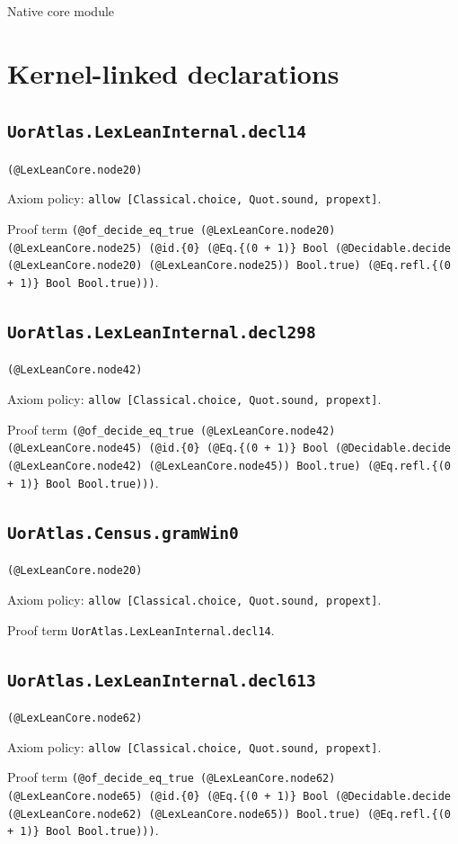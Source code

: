 \documentclass[11pt]{article}
\begin{document}
\begin{center}{\LARGE Native core module}\end{center}
\section*{Kernel-linked declarations}
\subsection*{\texttt{UorAtlas.LexLeanInternal.decl14}}
\noindent\texttt{(@LexLeanCore.node20)}\par
\noindent Axiom policy: \texttt{allow [Classical.choice, Quot.sound, propext]}.\par
\noindent Proof term \texttt{(@of\_decide\_eq\_true (@LexLeanCore.node20) (@LexLeanCore.node25) (@id.\{0\} (@Eq.\{(0 + 1)\} Bool (@Decidable.decide (@LexLeanCore.node20) (@LexLeanCore.node25)) Bool.true) (@Eq.refl.\{(0 + 1)\} Bool Bool.true)))}.\par
\subsection*{\texttt{UorAtlas.LexLeanInternal.decl298}}
\noindent\texttt{(@LexLeanCore.node42)}\par
\noindent Axiom policy: \texttt{allow [Classical.choice, Quot.sound, propext]}.\par
\noindent Proof term \texttt{(@of\_decide\_eq\_true (@LexLeanCore.node42) (@LexLeanCore.node45) (@id.\{0\} (@Eq.\{(0 + 1)\} Bool (@Decidable.decide (@LexLeanCore.node42) (@LexLeanCore.node45)) Bool.true) (@Eq.refl.\{(0 + 1)\} Bool Bool.true)))}.\par
\subsection*{\texttt{UorAtlas.Census.gramWin0}}
\noindent\texttt{(@LexLeanCore.node20)}\par
\noindent Axiom policy: \texttt{allow [Classical.choice, Quot.sound, propext]}.\par
\noindent Proof term \texttt{UorAtlas.LexLeanInternal.decl14}.\par
\subsection*{\texttt{UorAtlas.LexLeanInternal.decl613}}
\noindent\texttt{(@LexLeanCore.node62)}\par
\noindent Axiom policy: \texttt{allow [Classical.choice, Quot.sound, propext]}.\par
\noindent Proof term \texttt{(@of\_decide\_eq\_true (@LexLeanCore.node62) (@LexLeanCore.node65) (@id.\{0\} (@Eq.\{(0 + 1)\} Bool (@Decidable.decide (@LexLeanCore.node62) (@LexLeanCore.node65)) Bool.true) (@Eq.refl.\{(0 + 1)\} Bool Bool.true)))}.\par
\end{document}
